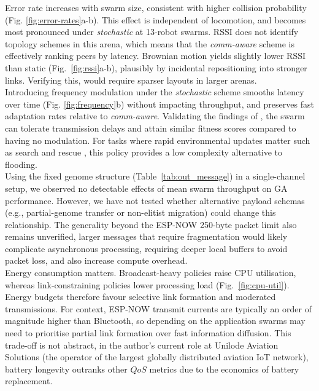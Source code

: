\documentclass[conference]{IEEEtran}
\begin{document}
Error rate increases with swarm size, consistent with higher collision probability (Fig. \ref{fig:error-rates}a-b). This effect is independent of locomotion, and becomes most pronounced under \emph{stochastic} at 13-robot swarms. RSSI does not identify topology schemes in this arena, which means that the \emph{comm-aware} scheme is effectively ranking peers by latency. Brownian motion yields slightly lower RSSI than static (Fig.~\ref{fig:rssi}a-b), plausibly by incidental repositioning into stronger links. Verifying this, would require sparser layouts in larger arenas. \\

Introducing frequency modulation under the \emph{stochastic} scheme smooths latency over time (Fig. \ref{fig:frequency}b) without impacting throughput, and preserves fast adaptation rates relative to \emph{comm-aware}. Validating the findings of \cite{tsianos_impact_2012}, the swarm can tolerate transmission delays and attain similar fitness scores compared to having no modulation. For tasks where rapid environmental updates matter such as search and rescue \cite{perrin_decentralised_2012}, this policy provides a low complexity alternative to flooding. \\

Using the fixed genome structure (Table~\ref{tab:out_message}) in a single-channel setup, we observed no detectable effects of mean swarm throughput on GA performance. However, we have not tested whether alternative payload schemas (e.g., partial-genome transfer or non-elitist migration) could change this relationship. The generality beyond the ESP-NOW 250-byte packet limit also remains unverified, larger messages that require fragmentation would likely complicate asynchronous processing, requiring deeper local buffers to avoid packet loss, and also increase compute overhead. \\

Energy consumption matters. Broadcast-heavy policies raise CPU utilisation, whereas link-constraining policies lower processing load (Fig.~\ref{fig:cpu-util}). Energy budgets therefore favour selective link formation and moderated transmissions. For context, ESP-NOW transmit currents are typically an order of magnitude higher than Bluetooth, so depending on the application swarms may need to prioritise partial link formation over fast information diffusion. This trade-off is not abstract, in the author's current role at Unilode Aviation Solutions (the operator of the largest globally distributed aviation IoT network), battery longevity outranks other $QoS$ metrics due to the economics of battery replacement. \\
\end{document}
